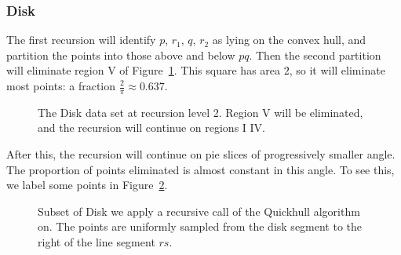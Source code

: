 \subsubsection{Disk}

The first recursion will identify $p$, $r_1$, $q$, $r_2$ as lying on the
convex hull, and partition the points into those above and below $pq$.
Then the second partition will eliminate region V of 
Figure~\ref{fig:disk_level2}. This square has area $2$, so it will eliminate
most points: a fraction $\frac{2}{\pi} \approx 0.637$.

\begin{figure}[ht]
    \caption{The Disk data set at recursion level 2. Region V will be 
             eliminated, and the recursion will continue on regions I 
             \textemdash IV.}
    \label{fig:disk_level2}
\end{figure}

After this, the recursion will continue on pie slices of progressively smaller
angle. The proportion of points eliminated is almost constant in this angle.
To see this, we label some points in Figure~\ref{fig:disk_level3+}. 

\begin{figure}[ht]
    \caption{Subset of Disk we apply a recursive call of the Quickhull 
             algorithm on. The points are uniformly sampled from the disk
             segment to the right of the line segment $rs$.}
    \label{fig:disk_level3+}
\end{figure}

